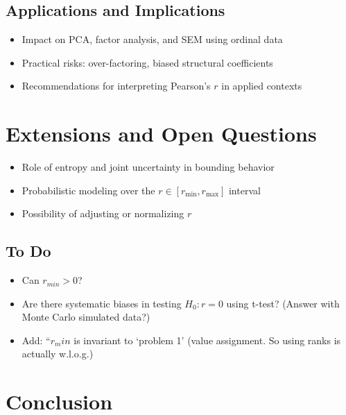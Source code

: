 \documentclass[
  12pt,
]{article}
\providecommand{\tightlist}{%
  \setlength{\itemsep}{0pt}\setlength{\parskip}{0pt}}\usepackage{longtable,booktabs,array}
\begin{document}
\subsection{Applications and
Implications}\label{applications-and-implications}

\begin{itemize}
\tightlist
\item
  Impact on PCA, factor analysis, and SEM using ordinal data\\
\item
  Practical risks: over-factoring, biased structural coefficients\\
\item
  Recommendations for interpreting Pearson's \(r\) in applied contexts
\end{itemize}

\section{Extensions and Open
Questions}\label{extensions-and-open-questions}

\begin{itemize}
\tightlist
\item
  Role of entropy and joint uncertainty in bounding behavior\\
\item
  Probabilistic modeling over the \(r \in [r_{\min}, r_{\max}]\)
  interval\\
\item
  Possibility of adjusting or normalizing \(r\)
\end{itemize}

\subsection{To Do}\label{to-do}

\begin{itemize}
\tightlist
\item
  Can \(r_{min} >0\)?
\item
  Are there systematic biases in testing \(H_0: r=0\) using t-test?
  (Answer with Monte Carlo simulated data?)
\item
  Add: ``\(r_min\) is invariant to `problem 1' (value assignment. So
  using ranks is actually w.l.o.g.)
\end{itemize}

\section{Conclusion}\label{conclusion}
\end{document}
